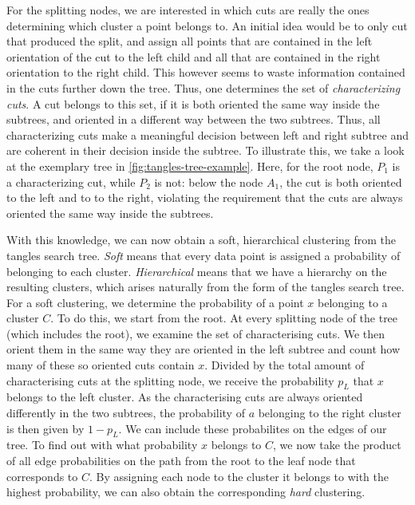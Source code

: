 For the splitting nodes, we are interested in which cuts are really the ones determining 
which cluster a point belongs to. An initial idea would be to only cut that produced the split,
and assign all points that are contained in the left orientation of the cut to the
left child and all that are contained in the right orientation to the right child. This
however seems to waste information contained in the cuts further down the tree. 
Thus, one determines the set of \textit{characterizing cuts}.  
A cut belongs to this set, if it is both oriented the same way inside the subtrees, and oriented in a different way between the two subtrees. Thus, all characterizing cuts make a meaningful decision between left and right subtree and are coherent in their decision inside the subtree. 
To illustrate this, we take a look at the exemplary tree in \autoref{fig:tangles-tree-example}. Here, for the root node, $P_1$ is a characterizing cut,
while $P_2$ is not: below the node $A_1$, the cut is both oriented to the left and to to the right, violating the requirement that the cuts are always oriented
the same way inside the subtrees. 

With this knowledge, we can now obtain a soft, hierarchical clustering from the tangles search tree. 
\textit{Soft} means that every data point is assigned
a probability of belonging to each cluster. 
\textit{Hierarchical} means that we have a hierarchy on the resulting clusters, which arises naturally
from the form of the tangles search tree. 
For a soft clustering, we determine the probability of a point $x$ belonging to a cluster $C$. 
To do this, we start from the root. At every splitting node of the tree (which includes the root), we examine the set of characterising cuts.
We then orient them in the same way they are oriented in the left subtree and count how many of these so oriented cuts contain $x$. Divided by the total amount of characterising cuts at the
splitting node, we receive the probability $p_L$ that $x$ belongs to the left cluster. As the characterising cuts are always oriented differently in the two subtrees, the probability
of $a$ belonging to the right cluster is then given by $1 - p_L$. We can include these probabilites on the edges of our tree. 
To find out with what probability $x$ belongs to $C$, 
we now take the product of all edge probabilities on the path from the root to the leaf node that corresponds to $C$. 
By assigning each node to the cluster it belongs to with the highest probability, we can also obtain the corresponding \textit{hard} clustering.

